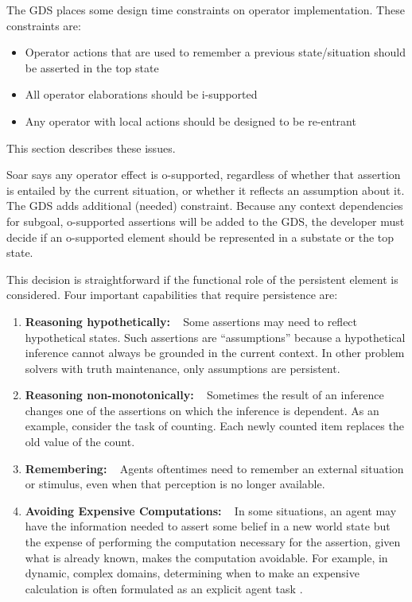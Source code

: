 The GDS places some design time constraints on operator implementation.
These constraints are:
\begin{itemize}
\item Operator actions that are used to remember a previous state/situation should be asserted in the top state
\item All operator elaborations should be i-supported
\item Any operator with local actions should be designed to be re-entrant
\end{itemize}
This section describes these issues.

Soar says any operator effect is o-supported, regardless of whether
that assertion is entailed by the current situation, or whether it
reflects an assumption about it.  The GDS adds additional (needed)
constraint.  Because any context dependencies for subgoal, o-supported
assertions will be added to the GDS, the developer must decide if an
o-supported element should be represented in a substate or the top
state.

This decision is straightforward if the functional role of the
persistent element is considered.  Four important capabilities that
require persistence are:
\begin{enumerate}

\item \textbf{Reasoning hypothetically:} ~ Some assertions may need to
reflect hypothetical states.  Such assertions are ``assumptions''
because a hypothetical inference cannot always be grounded in the
current context.  In other problem solvers with truth maintenance,
only assumptions are persistent.

\item \textbf{Reasoning non-monotonically:} ~
Sometimes the result of an inference changes one of the assertions on
which the inference is dependent.  As an example, consider the task of
counting.  Each newly counted item replaces the old value of the
count. 

\item \textbf{Remembering:} ~
Agents oftentimes need to remember an external situation or stimulus,
even when that perception is no longer available.  

\item \textbf{Avoiding Expensive Computations:} ~ In some situations,
an agent may have the information needed to assert some belief in a
new world state but the expense of performing the computation
necessary for the assertion, given what is already known, makes the
computation avoidable.  For example, in dynamic, complex domains,
determining when to make an expensive calculation is often formulated
as an explicit agent task \cite{Jones99:Automated}.
\end{enumerate}


